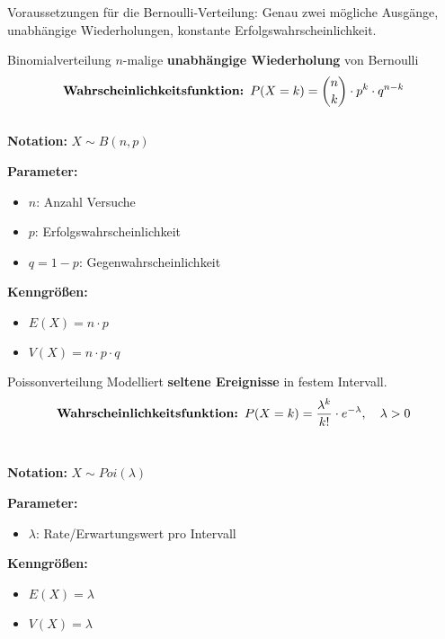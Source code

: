 \begin{remark}
Voraussetzungen für die Bernoulli-Verteilung: Genau zwei mögliche Ausgänge, unabhängige Wiederholungen, konstante Erfolgswahrscheinlichkeit.
\end{remark}


\begin{definition}{Binomialverteilung}
$n$-malige \textbf{unabhängige Wiederholung} von Bernoulli
\vspace{-2mm}\\
$$\text{\textbf{Wahrscheinlichkeitsfunktion: }}P(X=k) = \binom{n}{k} \cdot p^k \cdot q^{n-k}$$
\vspace{-4mm}\\
\textbf{Notation:} $X \sim B(n,p)$

\begin{minipage}[t]{0.6\textwidth}
\textbf{Parameter:}
\begin{itemize}
    \item $n$: Anzahl Versuche
    \item $p$: Erfolgswahrscheinlichkeit
    \item $q = 1-p$: Gegenwahrscheinlichkeit
\end{itemize}
\end{minipage}
\begin{minipage}[t]{0.35\textwidth}
\textbf{Kenngrößen:}
\begin{itemize}
    \item $E(X) = n \cdot p$
    \item $V(X) = n \cdot p \cdot q$
\end{itemize}
\end{minipage}
\end{definition}

\begin{definition}{Poissonverteilung}
Modelliert \textbf{seltene Ereignisse} in festem Intervall.
\vspace{-2mm}\\
$$\text{\textbf{Wahrscheinlichkeitsfunktion: }}P(X=k) = \frac{\lambda^k}{k!} \cdot e^{-\lambda}, \quad \lambda > 0$$
\vspace{-2mm}\\
\begin{minipage}[t]{0.6\textwidth}
\textbf{Notation:} $X \sim Poi(\lambda)$

\textbf{Parameter:}
\begin{itemize}
    \item $\lambda$: Rate/Erwartungswert pro Intervall
\end{itemize}
\end{minipage}
\begin{minipage}[t]{0.38\textwidth}
\textbf{Kenngrößen:}
\begin{itemize}
    \item $E(X) = \lambda$
    \item $V(X) = \lambda$
\end{itemize}
\end{minipage}
\end{definition}


